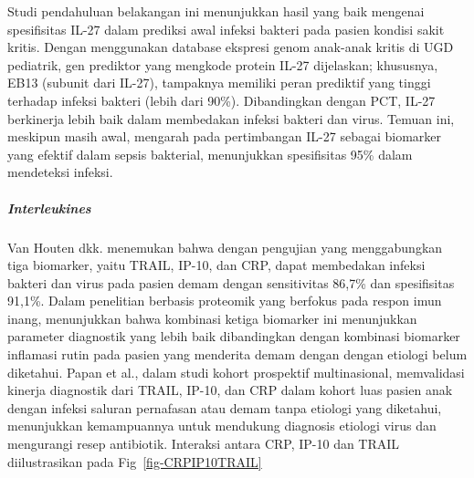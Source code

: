 \documentclass[
  10pt,
  letterpaper,
]{article}
\begin{document}
Studi pendahuluan belakangan ini menunjukkan hasil yang baik mengenai
spesifisitas IL-27 dalam prediksi awal infeksi bakteri pada pasien
kondisi sakit kritis. Dengan menggunakan database ekspresi genom
anak-anak kritis di UGD pediatrik, gen prediktor yang mengkode protein
IL-27 dijelaskan; khususnya, EB13 (subunit dari IL-27), tampaknya
memiliki peran prediktif yang tinggi terhadap infeksi bakteri (lebih
dari 90\%). Dibandingkan dengan PCT, IL-27 berkinerja lebih baik dalam
membedakan infeksi bakteri dan virus. Temuan ini, meskipun masih awal,
mengarah pada pertimbangan IL-27 sebagai biomarker yang efektif dalam
sepsis bakterial, menunjukkan spesifisitas 95\% dalam mendeteksi
infeksi.\citep{Hanna2015, Wong2012a}

\subparagraph{Interleukines}\label{interleukines}

Van Houten dkk. menemukan bahwa dengan pengujian yang menggabungkan tiga
biomarker, yaitu TRAIL, IP-10, dan CRP, dapat membedakan infeksi bakteri
dan virus pada pasien demam dengan sensitivitas 86,7\% dan spesifisitas
91,1\%.\citep{van2017} Dalam penelitian berbasis proteomik yang berfokus
pada respon imun inang, menunjukkan bahwa kombinasi ketiga biomarker ini
menunjukkan parameter diagnostik yang lebih baik dibandingkan dengan
kombinasi biomarker inflamasi rutin pada pasien yang menderita demam
dengan dengan etiologi belum diketahui. Papan et al., dalam studi kohort
prospektif multinasional, memvalidasi kinerja diagnostik dari TRAIL,
IP-10, dan CRP dalam kohort luas pasien anak dengan infeksi saluran
pernafasan atau demam tanpa etiologi yang diketahui, menunjukkan
kemampuannya untuk mendukung diagnosis etiologi virus dan mengurangi
resep antibiotik.\citep{Papan2022} Interaksi antara CRP, IP-10 dan TRAIL
diilustrasikan pada Fig~\ref{fig-CRPIP10TRAIL}
\end{document}
